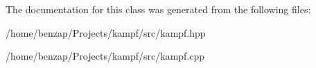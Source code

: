 The documentation for this class was generated from the following files\-:\begin{DoxyCompactItemize}
\item 
/home/benzap/\-Projects/kampf/src/kampf.\-hpp\item 
/home/benzap/\-Projects/kampf/src/kampf.\-cpp\end{DoxyCompactItemize}
